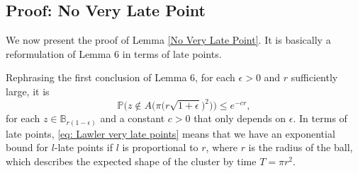 \documentclass[11pt]{article}
\makeatletter
\renewenvironment{proof}[1][\proofname]{
   \par\pushQED{\qed}\normalfont
   \topsep6\p@\@plus6\p@\relax
   \trivlist\item[\hskip\labelsep\bfseries#1\@addpunct{.}]
   \ignorespaces
}{
   \popQED\endtrivlist\@endpefalse
}
\numberwithin{equation}{section}
\makeatother
\begin{document}
\subsection{Proof: No Very Late Point}
\label{sec: no very late point}
We now present the proof of Lemma \ref{No Very Late Point}. 
It is basically a reformulation of \cite{lawler_idla} Lemma 6 
in terms of late points. 

\begin{proof}[Proof of Lemma \ref{No Very Late Point}]
  \renewcommand{\qedsymbol}{}
  Rephrasing the first conclusion of \cite{lawler_idla} 
  Lemma 6, for each $\epsilon > 0$ and $r$ sufficiently large, it is 
  \begin{equation} \label{eq: Lawler very late points}
    \mathbb{P} \Big( z \notin A 
    \big( \pi \big( r\sqrt{1+ \epsilon} \big) ^2 \big) \Big)
    \leq e^{-c r}, 
  \end{equation}
  for each $z \in \mathbb{B}_{r (1-\epsilon)}$ and a 
  constant $c>0$ that only depends on $\epsilon$.
  In terms of late points, \eqref{eq: Lawler very late points} means that we have an 
  exponential bound for $l$-late points if $l$ is proportional to $r$, where $r$ 
  is the radius of the ball, which describes the expected shape of the 
  cluster by time $T = \pi r^2$.


\end{proof}
\end{document}
